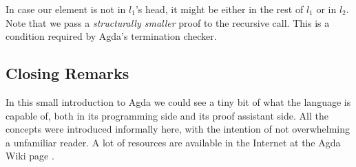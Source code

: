 
In case our element is not in $l_1$'s head, it might be either in the rest of $l_1$ or in $l_2$.
Note that we pass a \emph{structurally smaller} proof to the recursive call. This is a condition required by
Agda's termination checker.

\subsection{Closing Remarks}

In this small introduction to Agda we could see a tiny bit of what the language is capable of,
both in its programming side and its proof assistant side. All the concepts were introduced
informally here, with the intention of not overwhelming a unfamiliar reader. A lot of resources
are available in the Internet at the Agda Wiki page \cite{AgdaTutorials}. 



